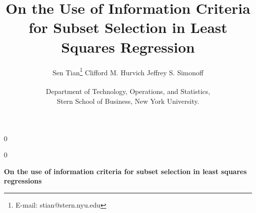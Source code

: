 \documentclass{article}
\newcommand{\blind}{0}
\begin{document}
%

\def\spacingset#1{\renewcommand{\baselinestretch}%
{#1}\small\normalsize} \spacingset{1}

\blind
{
  \title{\bf On the Use of Information Criteria for Subset Selection in Least Squares Regression}
  \author{Sen Tian\footnote{E-mail: stian@stern.nyu.edu} \quad Clifford M. Hurvich  \quad Jeffrey S. Simonoff \\\\
    Department of Technology, Operations, and Statistics, \\Stern School of Business, New York University.}
  \date{}
  \maketitle
} \fi

\blind
{
  \bigskip
  \bigskip
  \bigskip
  \begin{center}
    {\LARGE\bf On the use of information criteria for subset selection in least squares regressions}
\end{center}
  \medskip
} \fi








\clearpage




\end{document}

